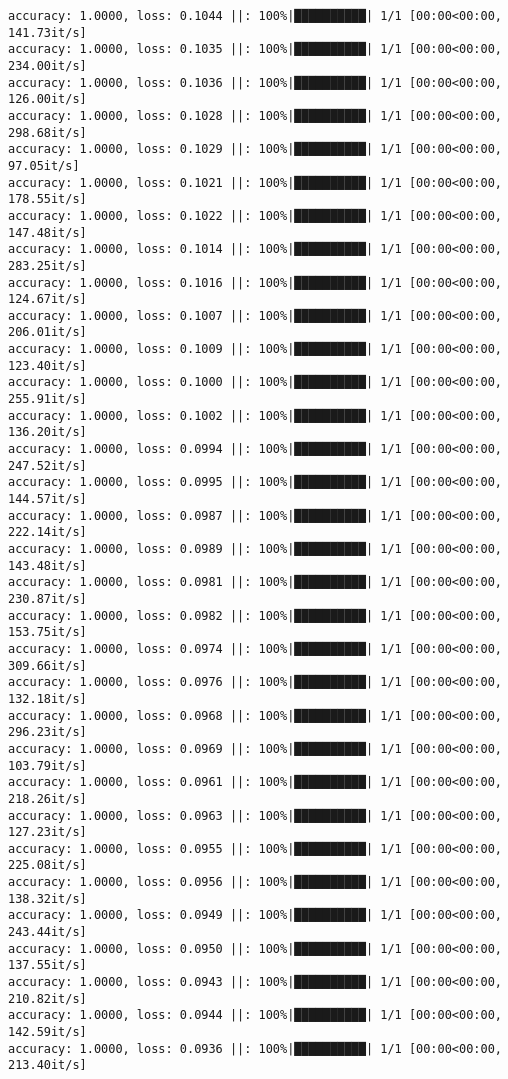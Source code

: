 \documentclass[
]{article}
\begin{document}
\begin{verbatim}
accuracy: 1.0000, loss: 0.1044 ||: 100%|██████████| 1/1 [00:00<00:00, 141.73it/s]
accuracy: 1.0000, loss: 0.1035 ||: 100%|██████████| 1/1 [00:00<00:00, 234.00it/s]
accuracy: 1.0000, loss: 0.1036 ||: 100%|██████████| 1/1 [00:00<00:00, 126.00it/s]
accuracy: 1.0000, loss: 0.1028 ||: 100%|██████████| 1/1 [00:00<00:00, 298.68it/s]
accuracy: 1.0000, loss: 0.1029 ||: 100%|██████████| 1/1 [00:00<00:00, 97.05it/s]
accuracy: 1.0000, loss: 0.1021 ||: 100%|██████████| 1/1 [00:00<00:00, 178.55it/s]
accuracy: 1.0000, loss: 0.1022 ||: 100%|██████████| 1/1 [00:00<00:00, 147.48it/s]
accuracy: 1.0000, loss: 0.1014 ||: 100%|██████████| 1/1 [00:00<00:00, 283.25it/s]
accuracy: 1.0000, loss: 0.1016 ||: 100%|██████████| 1/1 [00:00<00:00, 124.67it/s]
accuracy: 1.0000, loss: 0.1007 ||: 100%|██████████| 1/1 [00:00<00:00, 206.01it/s]
accuracy: 1.0000, loss: 0.1009 ||: 100%|██████████| 1/1 [00:00<00:00, 123.40it/s]
accuracy: 1.0000, loss: 0.1000 ||: 100%|██████████| 1/1 [00:00<00:00, 255.91it/s]
accuracy: 1.0000, loss: 0.1002 ||: 100%|██████████| 1/1 [00:00<00:00, 136.20it/s]
accuracy: 1.0000, loss: 0.0994 ||: 100%|██████████| 1/1 [00:00<00:00, 247.52it/s]
accuracy: 1.0000, loss: 0.0995 ||: 100%|██████████| 1/1 [00:00<00:00, 144.57it/s]
accuracy: 1.0000, loss: 0.0987 ||: 100%|██████████| 1/1 [00:00<00:00, 222.14it/s]
accuracy: 1.0000, loss: 0.0989 ||: 100%|██████████| 1/1 [00:00<00:00, 143.48it/s]
accuracy: 1.0000, loss: 0.0981 ||: 100%|██████████| 1/1 [00:00<00:00, 230.87it/s]
accuracy: 1.0000, loss: 0.0982 ||: 100%|██████████| 1/1 [00:00<00:00, 153.75it/s]
accuracy: 1.0000, loss: 0.0974 ||: 100%|██████████| 1/1 [00:00<00:00, 309.66it/s]
accuracy: 1.0000, loss: 0.0976 ||: 100%|██████████| 1/1 [00:00<00:00, 132.18it/s]
accuracy: 1.0000, loss: 0.0968 ||: 100%|██████████| 1/1 [00:00<00:00, 296.23it/s]
accuracy: 1.0000, loss: 0.0969 ||: 100%|██████████| 1/1 [00:00<00:00, 103.79it/s]
accuracy: 1.0000, loss: 0.0961 ||: 100%|██████████| 1/1 [00:00<00:00, 218.26it/s]
accuracy: 1.0000, loss: 0.0963 ||: 100%|██████████| 1/1 [00:00<00:00, 127.23it/s]
accuracy: 1.0000, loss: 0.0955 ||: 100%|██████████| 1/1 [00:00<00:00, 225.08it/s]
accuracy: 1.0000, loss: 0.0956 ||: 100%|██████████| 1/1 [00:00<00:00, 138.32it/s]
accuracy: 1.0000, loss: 0.0949 ||: 100%|██████████| 1/1 [00:00<00:00, 243.44it/s]
accuracy: 1.0000, loss: 0.0950 ||: 100%|██████████| 1/1 [00:00<00:00, 137.55it/s]
accuracy: 1.0000, loss: 0.0943 ||: 100%|██████████| 1/1 [00:00<00:00, 210.82it/s]
accuracy: 1.0000, loss: 0.0944 ||: 100%|██████████| 1/1 [00:00<00:00, 142.59it/s]
accuracy: 1.0000, loss: 0.0936 ||: 100%|██████████| 1/1 [00:00<00:00, 213.40it/s]

\end{verbatim}
\end{document}
